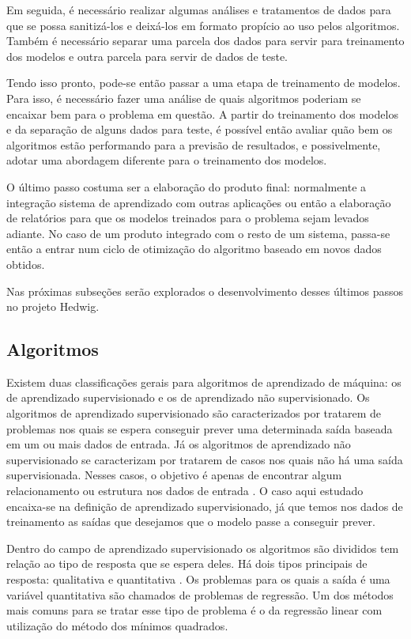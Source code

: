 			Em seguida, é necessário realizar algumas análises e tratamentos de dados para que se possa sanitizá-los e deixá-los em formato propício ao uso pelos algoritmos. Também é necessário separar uma parcela dos dados para servir para treinamento dos modelos e outra parcela para servir de dados de teste.

			Tendo isso pronto, pode-se então passar a uma etapa de treinamento de modelos. Para isso, é necessário fazer uma análise de quais algoritmos poderiam se encaixar bem para o problema em questão. A partir do treinamento dos modelos e da separação de alguns dados para teste, é possível então avaliar quão bem os algoritmos estão performando para a previsão de resultados, e possivelmente, adotar uma abordagem diferente para o treinamento dos modelos.

			O último passo costuma ser a elaboração do produto final: normalmente a integração sistema de aprendizado com outras aplicações ou então a elaboração de relatórios para que os modelos treinados para o problema sejam levados adiante. No caso de um produto integrado com o resto de um sistema, passa-se então a entrar num ciclo de otimização do algoritmo baseado em novos dados obtidos.

			Nas próximas subseções serão explorados o desenvolvimento desses últimos passos no projeto Hedwig.

		\subsection{Algoritmos}

			Existem duas classificações gerais para algoritmos de aprendizado de máquina: os de aprendizado supervisionado e os de aprendizado não supervisionado. Os algoritmos de aprendizado supervisionado são caracterizados por tratarem de problemas nos quais se espera conseguir prever uma determinada saída baseada em um ou mais dados de entrada. Já os algoritmos de aprendizado não supervisionado se caracterizam por tratarem de casos nos quais não há uma saída supervisionada. Nesses casos, o objetivo é apenas de encontrar algum relacionamento ou estrutura nos dados de entrada \cite{islr}. O caso aqui estudado encaixa-se na definição de aprendizado supervisionado, já que temos nos dados de treinamento as saídas que desejamos que o modelo passe a conseguir prever.

			Dentro do campo de aprendizado supervisionado os algoritmos são divididos tem relação ao tipo de resposta que se espera deles. Há dois tipos principais de resposta: qualitativa e quantitativa  \cite{islr}. Os problemas para os quais a saída é uma variável quantitativa são chamados de problemas de regressão. Um dos métodos mais comuns para se tratar esse tipo de problema é o da regressão linear com utilização do método dos mínimos quadrados.

